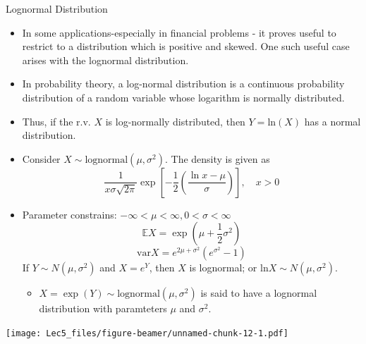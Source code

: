 \documentclass[ignorenonframetext,]{beamer}
\providecommand{\tightlist}{%
  \setlength{\itemsep}{0pt}\setlength{\parskip}{0pt}}
\begin{document}
\begin{frame}{Lognormal Distribution}

\begin{itemize}
\item
  In some applications-especially in financial problems - it proves
  useful to restrict to a distribution which is positive and skewed. One
  such useful case arises with the lognormal distribution.
\item
  In probability theory, a log-normal distribution is a continuous
  probability distribution of a random variable whose logarithm is
  normally distributed.
\item
  Thus, if the r.v. \(X\) is log-normally distributed, then
  \(Y=\text{ln}(X)\) has a normal distribution.
\item
  Consider \(X\sim \text{lognormal}(\mu,\sigma^2)\). The density is
  given as
  \[\frac{1}{x\sigma\sqrt{2\pi}}\exp\left[-\frac{1}{2}\left(\frac{\ln x-\mu}{\sigma}\right)\right],\quad x>0\]
\item
  Parameter constrains: \(-\infty<\mu<\infty,0<\sigma<\infty\)
  \[\mathbb{E}X=\exp\left(\mu+\frac{1}{2}\sigma^2\right)\]
  \[\text{var}X=e^{2\mu+\sigma^2}(e^{\sigma^2}-1)\] If
  \(Y\sim N(\mu,\sigma^2)\) and \(X=e^Y\), then \(X\) is lognormal; or
  \(\text{ln}X\sim N(\mu,\sigma^2)\).

  \begin{itemize}
  \tightlist
  \item
    \(X=\exp(Y)\sim\text{lognormal}(\mu,\sigma^2)\) is said to have a
    lognormal distribution with paramteters \(\mu\) and \(\sigma^2\).
  \end{itemize}
\end{itemize}

\texttt{[image: Lec5\_files/figure-beamer/unnamed-chunk-12-1.pdf]}

\end{frame}
\end{document}
